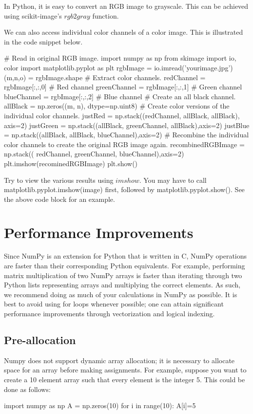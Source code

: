 \documentclass{article}
\begin{document}
In Python, it is easy to convert an RGB image to grayscale. This can be achieved using scikit-image's \href{http://scikit-image.org/docs/stable/api/skimage.color.html#rgb2gray}{$rgb2gray$} function.

We can also access individual color channels of a color image. This is illustrated in the code snippet below.
\begin{python}
# Read in original RGB image.
import numpy as np
from skimage import io, color
import matplotlib.pyplot as plt
rgbImage = io.imread('yourimage.jpg')
(m,n,o) = rgbImage.shape
# Extract color channels.
redChannel = rgbImage[:,:,0] # Red channel
greenChannel = rgbImage[:,:,1] # Green channel
blueChannel = rgbImage[:,:,2] # Blue channel
# Create an all black channel.
allBlack = np.zeros((m, n), dtype=np.uint8)
# Create color versions of the individual color channels.
justRed = np.stack((redChannel, allBlack, allBlack), axis=2)
justGreen = np.stack((allBlack, greenChannel, allBlack),axis=2)
justBlue = np.stack((allBlack, allBlack, blueChannel),axis=2)
# Recombine the individual color channels to create the original RGB image again.
recombinedRGBImage = np.stack(( redChannel, greenChannel, blueChannel),axis=2)
plt.imshow(recominedRGBImage)
plt.show()
\end{python}

Try to view the various results using \href{https://matplotlib.org/api/_as_gen/matplotlib.pyplot.imshow.html}{$imshow$}. You may have to call matplotlib.pyplot.imshow(image) first, followed by matplotlib.pyplot.show(). See the above code block for an example.


\section{Performance Improvements}
Since NumPy is an extension for Python that is written in C, NumPy operations are faster than their corresponding Python equivalents. For example, performing matrix multiplication of two NumPy arrays is faster than iterating through two Python lists representing arrays and multiplying the correct elements. As such, we recommend doing as much of your calculations in NumPy as possible.
It is best to avoid using for loops whenever possible; one can attain significant performance improvements through vectorization and logical indexing.

\subsection{Pre-allocation}
Numpy does not support dynamic array allocation; it is necessary to allocate space for an array before making assignments. For example, suppose you want to create a 10 element array such that every element is the integer 5. This could be done as follows:
\begin{python}
import numpy as np
A = np.zeros(10)
for i in range(10):
    A[i]=5
\end{python}
\end{document}
